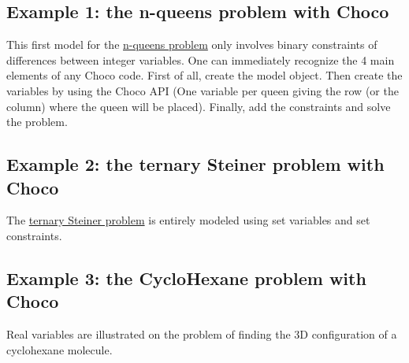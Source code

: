 \subsection{Example 1: the n-queens problem with Choco}\label{model:example1:nqueenschoco}\hypertarget{model:example1:nqueenschoco}{}
This first model for the \hyperlink{introduction:example1:nqueens}{n-queens problem} only involves binary constraints of differences between integer variables. One can immediately recognize the 4 main elements of any Choco code. First of all, create the model object. Then create the variables by using the Choco API (One variable per queen giving the row (or the column) where the queen will be placed). Finally, add the constraints and solve the problem. 



\subsection{Example 2: the ternary Steiner problem with Choco}\label{model:example2:ternarysteinerchoco}\hypertarget{model:example2:ternarysteinerchoco}{}
The \hyperlink{introduction:example2:theternarysteinerproblem}{ternary Steiner problem} is entirely modeled using set variables and set constraints. 


\subsection{Example 3: the CycloHexane problem with Choco}\label{model:example3:thecyclohexaneproblemwithchoco}\hypertarget{model:example3:thecyclohexaneproblemwithchoco}{}
Real variables are illustrated on the problem of finding the 3D configuration of a cyclohexane molecule. 



